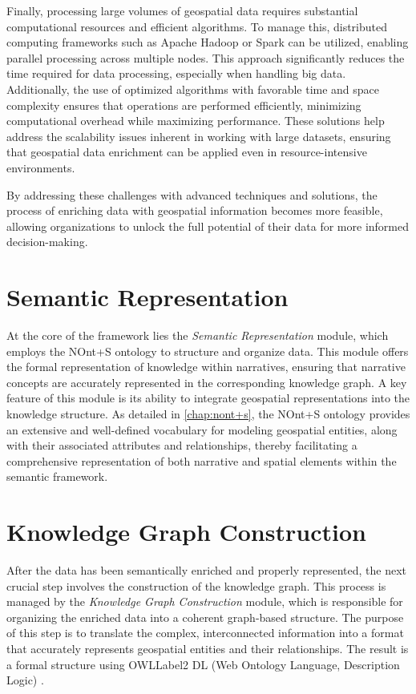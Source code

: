 Finally, processing large volumes of geospatial data requires substantial computational resources and efficient algorithms. To manage this, distributed computing frameworks such as Apache Hadoop or Spark can be utilized, enabling parallel processing across multiple nodes. This approach significantly reduces the time required for data processing, especially when handling big data. Additionally, the use of optimized algorithms with favorable time and space complexity ensures that operations are performed efficiently, minimizing computational overhead while maximizing performance. These solutions help address the scalability issues inherent in working with large datasets, ensuring that geospatial data enrichment can be applied even in resource-intensive environments.

By addressing these challenges with advanced techniques and solutions, the process of enriching data with geospatial information becomes more feasible, allowing organizations to unlock the full potential of their data for more informed decision-making.



\section{Semantic Representation}\label{VI-sec:semantic-representation}

At the core of the framework lies the \textit{Semantic Representation} module, which employs the NOnt+S ontology to structure and organize data. This module offers the formal representation of knowledge within narratives, ensuring that narrative concepts are accurately represented in the corresponding knowledge graph. A key feature of this module is its ability to integrate geospatial representations into the knowledge structure. As detailed in \ref{chap:nont+s}, the NOnt+S ontology provides an extensive and well-defined vocabulary for modeling geospatial entities, along with their associated attributes and relationships, thereby facilitating a comprehensive representation of both narrative and spatial elements within the semantic framework.

\section{Knowledge Graph Construction}\label{VI-sec:KG}

After the data has been semantically enriched and properly represented, the next crucial step involves the construction of the knowledge graph. This process is managed by the \textit{Knowledge Graph Construction} module, which is responsible for organizing the enriched data into a coherent graph-based structure. The purpose of this step is to translate the complex, interconnected information into a format that accurately represents geospatial entities and their relationships. The result is a formal structure using \acrshort{OWLLabel}2 DL (Web Ontology Language, Description Logic) \cite{OWLWebOntologyc}.

